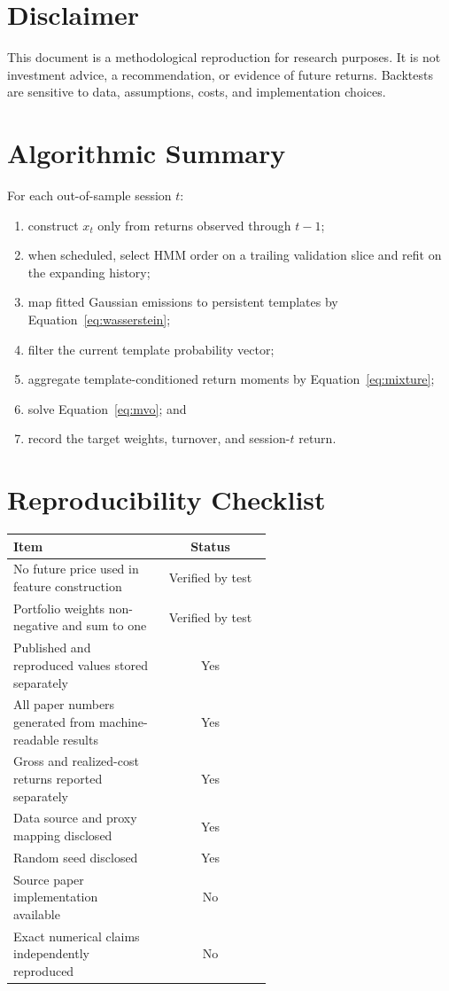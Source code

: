 \documentclass[11pt]{article}
\begin{document}
\section*{Disclaimer}

This document is a methodological reproduction for research purposes. It is not investment advice, a recommendation, or evidence of future returns. Backtests are sensitive to data, assumptions, costs, and implementation choices.

\appendix
\section{Algorithmic Summary}

For each out-of-sample session \(t\):
\begin{enumerate}
  \item construct \(x_t\) only from returns observed through \(t-1\);
  \item when scheduled, select HMM order on a trailing validation slice and refit on the expanding history;
  \item map fitted Gaussian emissions to persistent templates by Equation~\eqref{eq:wasserstein};
  \item filter the current template probability vector;
  \item aggregate template-conditioned return moments by Equation~\eqref{eq:mixture};
  \item solve Equation~\eqref{eq:mvo}; and
  \item record the target weights, turnover, and session-\(t\) return.
\end{enumerate}

\section{Reproducibility Checklist}

\begin{tabular}{p{0.58\linewidth}c}
\toprule
Item & Status \\
\midrule
No future price used in feature construction & Verified by test \\
Portfolio weights non-negative and sum to one & Verified by test \\
Published and reproduced values stored separately & Yes \\
All paper numbers generated from machine-readable results & Yes \\
Gross and realized-cost returns reported separately & Yes \\
Data source and proxy mapping disclosed & Yes \\
Random seed disclosed & Yes \\
Source paper implementation available & No \\
Exact numerical claims independently reproduced & No \\
\bottomrule
\end{tabular}
\end{document}
